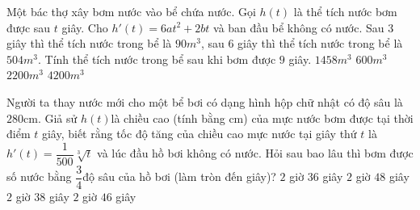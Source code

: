 \begin{ex}%
Một bác thợ xây bơm nước vào bể chứa nước. Gọi $h\left( t \right)$ là thể tích nước bơm được sau $t$ giây. Cho ${h}'\left( t \right)=6at^2+2bt$ và ban đầu bể không có nước. Sau 3 giây thì thể tích nước trong bể là $90m^3$, sau $6$ giây thì thể tích nước trong bể là $504m^3$. Tính thể tích nước trong bể sau khi bơm được $9$ giây.
\choice
{\True $1458m^3$}
{$600m^3$}
{$2200m^3$}
{$4200m^3$}
\end{ex}
\begin{ex}%
Người ta thay nước mới cho một bể bơi có dạng hình hộp chữ nhật có độ sâu là $280$cm. Giả sử $h\left( t \right)$là chiều cao (tính bằng cm) của mực nước bơm được tại thời điểm $t$ giây, biết rằng tốc độ tăng của chiều cao mực nước tại giây thứ $t$ là ${h}'(t)=\dfrac{1}{500}\sqrt[3]{t}$ và lúc đầu hồ bơi không có nước. Hỏi sau bao lâu thì bơm được số nước bằng $\dfrac{3}{4}$độ sâu của hồ bơi (làm tròn đến giây)?
\choice
{$2$ giờ $36$ giây}
{$2$ giờ $48$ giây}
{\True $2$ giờ $38$ giây}
{$2$ giờ $46$ giây}
\end{ex}


